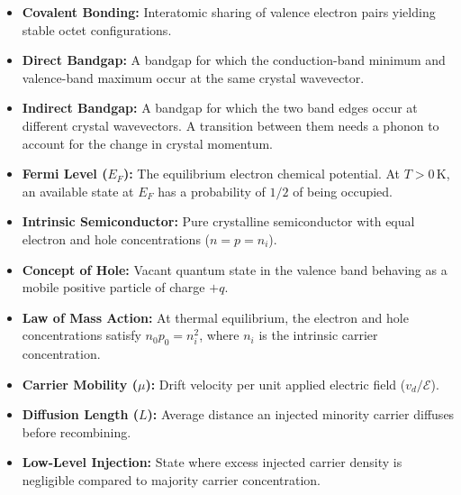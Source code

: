 \documentclass[12pt,a4paper]{article}
\begin{document}
\begin{tcolorbox}[defbox, title={\textbf{One-Line Definitions}}, title after break={One-Line Definitions (contd.)}]
\begin{itemize}[leftmargin=*, itemsep=2pt, topsep=0pt]
  \item \textbf{Covalent Bonding:} Interatomic sharing of valence electron pairs yielding stable octet configurations.
  \item \textbf{Direct Bandgap:} A bandgap for which the conduction-band minimum and valence-band maximum occur at the same crystal wavevector.
  \item \textbf{Indirect Bandgap:} A bandgap for which the two band edges occur at different crystal wavevectors. A transition between them needs a phonon to account for the change in crystal momentum.
  \item \textbf{Fermi Level ($E_F$):} The equilibrium electron chemical potential. At $T>0\,\mathrm K$, an available state at $E_F$ has a probability of $1/2$ of being occupied.
  \item \textbf{Intrinsic Semiconductor:} Pure crystalline semiconductor with equal electron and hole concentrations ($n=p=n_i$).
  \item \textbf{Concept of Hole:} Vacant quantum state in the valence band behaving as a mobile positive particle of charge $+q$.
  \item \textbf{Law of Mass Action:} At thermal equilibrium, the electron and hole concentrations satisfy $n_0p_0=n_i^2$, where $n_i$ is the intrinsic carrier concentration.
  \item \textbf{Carrier Mobility ($\mu$):} Drift velocity per unit applied electric field ($v_d / \mathcal{E}$).
  \item \textbf{Diffusion Length ($L$):} Average distance an injected minority carrier diffuses before recombining.
  \item \textbf{Low-Level Injection:} State where excess injected carrier density is negligible compared to majority carrier concentration.
\end{itemize}
\end{tcolorbox}
\end{document}
